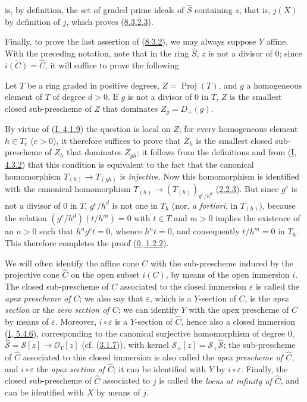 is, by definition, the set of graded prime ideals of $\widehat{S}$
containing $z$, that is, $j(X)$ by definition of $j$, which proves
(\hyperref[II.8.3.2.3]{8.3.2.3}).

Finally, to prove the last assertion of
(\hyperref[II.8.3.2]{8.3.2}), we may always suppose $Y$ affine. With
the preceding notation, note that in the ring $\widehat{S}$, $z$
is not a divisor of $0$; since $\overline{i(C)}=\widehat{C}$, it will suffice
to prove the following

\begin{lemma}[8.3.2.7]
\label{II.8.3.2.7}
Let $T$ be a ring graded in positive degrees,
$Z=\operatorname{Proj}(T)$, and $g$ a homogeneous element of $T$ of degree $d>0$.
If $g$ is not a divisor of $0$ in $T$, $Z$ is the smallest closed
sub-prescheme of $Z$ that dominates $Z_g=D_+(g)$.
\end{lemma}

By virtue of (\hyperref[I.4.1.9]{I, 4.1.9}) the question is local on $Z$;
for every homogeneous element $h\in T_e$ ($e>0$), it therefore suffices to prove that
$Z_h$ is the smallest closed sub-prescheme of $Z_h$ that dominates $Z_{gh}$;
it follows from the definitions and from (\hyperref[I.4.3.2]{I, 4.3.2}) that this
condition is equivalent to the fact that the canonical homomorphism
$T_{(h)}\to T_{(gh)}$ is \emph{injective}. Now this homomorphism is identified with
the canonical homomorphism
$T_{(h)}\to(T_{(h)})_{g^e/h^d}$ (\hyperref[II.2.2.3]{2.2.3}). But since
$g^e$ is not a divisor of $0$ in $T$, $g^e/h^d$ is not one in $T_h$
(nor, \emph{a fortiori}, in $T_{(h)}$), because the relation
$(g^e/h^d)(t/h^m)=0$ with $t\in T$ and $m>0$ implies the existence of an $n>0$
such that $h^ng^et=0$, whence $h^nt=0$, and consequently $t/h^m=0$ in $T_h$. This
therefore completes the proof (\hyperref[0.1.2.2]{0, 1.2.2}).

\begin{env}[8.3.3]
\label{II.8.3.3}
We will often identify the affine cone $C$ with the sub-prescheme induced by the
projective cone $\widehat{C}$ on the open subset $i(C)$, by means of the open
immersion $i$. The closed sub-prescheme of $C$ associated to the closed
immersion $\varepsilon$ is called the \emph{apex prescheme of $C$}; we also
say that $\varepsilon$, which is a $Y$-section of $C$, is the \emph{apex
section} or the \emph{zero section of $C$}; we can identify $Y$ with the
apex prescheme of $C$ by means of $\varepsilon$. Moreover,
$i\circ\varepsilon$ is a $Y$-section of $\widehat{C}$, hence also a
closed immersion (\hyperref[I.5.4.6]{I, 5.4.6}), corresponding to
the canonical surjective homomorphism of degree $0$,
$\widehat{\mathcal{S}}=\mathcal{S}[z]\to\mathcal{O}_Y[z]$
(cf. (\hyperref[II.3.1.7]{3.1.7})), with kernel
$\mathcal{S}_+[z]=\mathcal{S}_+\widehat{\mathcal{S}}$; the sub-prescheme of
$\widehat{C}$ associated to this closed immersion is also called the
\emph{apex prescheme of $\widehat{C}$}, and $i\circ\varepsilon$ the
\emph{apex section of $\widehat{C}$}; it can be identified with $Y$ by
$i\circ\varepsilon$. Finally, the closed sub-prescheme of $\widehat{C}$
associated to $j$ is called the \emph{locus at infinity of $\widehat{C}$}, and can
be identified with $X$ by means of $j$.
\end{env}

